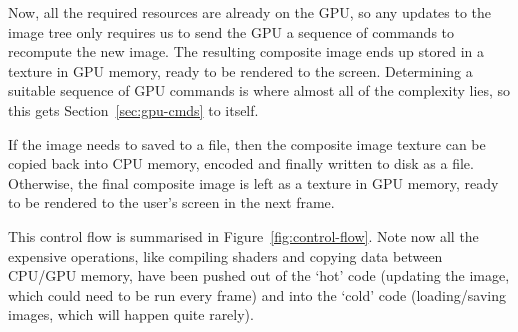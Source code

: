 \documentclass[12pt]{article}
\begin{document}
Now, all the required resources are already on the GPU, so any updates to the image tree only
requires us to send the GPU a sequence of commands to recompute the new image.  The resulting
composite image ends up stored in a texture in GPU memory, ready to be rendered to the screen.
Determining a suitable sequence of GPU commands is where almost all of the complexity lies, so this
gets Section~\ref{sec:gpu-cmds} to itself.

If the image needs to saved to a file, then the composite image texture can be copied back into CPU
memory, encoded and finally written to disk as a file.  Otherwise, the final composite image is left
as a texture in GPU memory, ready to be rendered to the user's screen in the next frame.

This control flow is summarised in Figure~\ref{fig:control-flow}.  Note now all the expensive
operations, like compiling shaders and copying data between CPU/GPU memory, have been pushed out of
the `hot' code (updating the image, which could need to be run every frame) and into the `cold' code
(loading/saving images, which will happen quite rarely).
\end{document}
